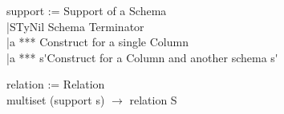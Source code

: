 \documentclass{article}
\begin{document}
\begin{frame}{}
\centering
	\begin{flushright}
	support := \hfill \quad Support of a Schema\hfill \\
	\quad |STyNil \hfill Schema Terminator\hfill \\
   	\quad |a \:*** \hfill Construct \:for \:a single Column \hfill \\
   	\quad |a \:*** \:s\'\hfill Construct \:for \:a Column and another schema s\' \hfill \\[3ex]
	\begin{flushleft}
	relation := \hfill \quad Relation\hfill \\
    \quad multiset (support s) $\rightarrow$ relation S \\
	\end{flushleft}
	\end{flushright}
\end{frame}
\end{document}
